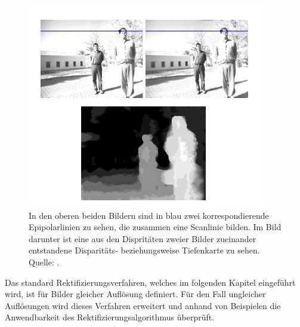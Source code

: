 %
%
%
%

\begin{figure}[!htb]
	\centering
	\includegraphics[width=.8\linewidth]{images/Disparity.png}
	\caption[Entstehung einer Disparitätskarte]{In den oberen beiden Bildern sind in blau zwei korrespondierende Epipolarlinien zu sehen, die zusammen eine Scanlinie bilden. Im Bild darunter ist eine aus den Dispritäten zweier Bilder zueinander entstandene Disparitäts- beziehungsweise Tiefenkarte zu sehen. Quelle: \cite{Javier}.} 
	\label{fig:DisparityMap}
\end{figure}

\pagebreak

Das standard Rektifizierungsverfahren, welches im folgenden Kapitel eingeführt wird, ist für Bilder gleicher Auflösung definiert. Für den Fall ungleicher Auflösungen wird dieses Verfahren erweitert und anhand von Beispielen die Anwendbarkeit des Rektifizierungsalgorithmus überprüft. 


